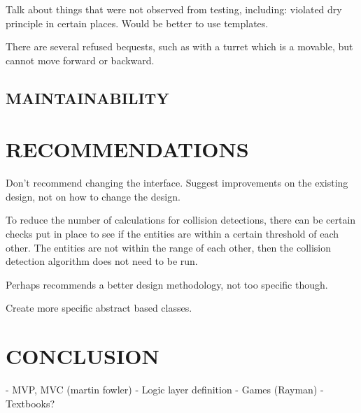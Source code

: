 \documentclass[10pt,twocolumn]{witseiepaper}
\begin{document}
Talk about things that were not observed from testing, including: violated dry principle in certain places. Would be better to use templates.

There are several refused bequests, such as with a turret which is a movable, but cannot move forward or backward.

\subsection{MAINTAINABILITY}

%
\section{RECOMMENDATIONS}
Don't recommend changing the interface. Suggest improvements on the existing design, not on how to change the design.

To reduce the number of calculations for collision detections, there can be certain checks put in place to see if the entities are within a certain threshold of each other. The entities are not within the range of each other, then the collision detection algorithm does not need to be run.

Perhaps recommends a better design methodology, not too specific though.

Create more specific abstract based classes.




%
\section{CONCLUSION}


\balance

%



- MVP, MVC (martin fowler)
- Logic layer definition
- Games (Rayman)
- Textbooks?
\end{document}
